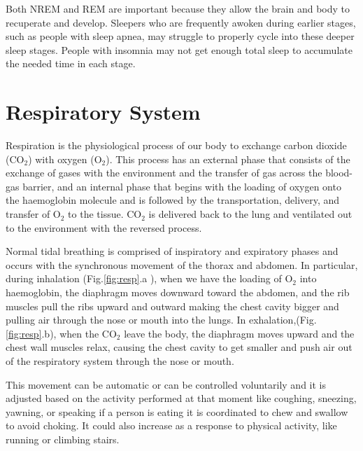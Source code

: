 Both NREM and REM are important because they allow the brain and body to recuperate and develop. Sleepers who are frequently awoken during earlier stages, such as people with sleep apnea, may struggle to properly cycle into these deeper sleep stages. People with insomnia may not get enough total sleep to accumulate the needed time in each stage.


\section{Respiratory System} \label{cap:respiratorySystem}

Respiration is the physiological process\cite{FISHER1983223} of our body to exchange carbon dioxide (CO$_2$) with oxygen (O$_2$). This process has an external phase that consists of the exchange of gases with the environment and the transfer of gas across the blood-gas barrier, and an internal phase that begins with the loading of oxygen onto the haemoglobin molecule and is followed by the transportation, delivery, and transfer of O$_2$ to the tissue. CO$_2$ is delivered back to the lung and ventilated out to the environment with the reversed process.

Normal tidal breathing is comprised of inspiratory and expiratory phases and occurs with the synchronous movement of the thorax and abdomen.
In particular, during inhalation (Fig.\ref{fig:resp}.a ), when we have the loading of O$_2$ into haemoglobin, the diaphragm moves downward toward the abdomen, and the rib muscles pull the ribs upward and outward making the chest cavity bigger and pulling air through the nose or mouth into the lungs. In exhalation,(Fig.\ref{fig:resp}.b), when the CO$_2$ leave the body, the diaphragm moves upward and the chest wall muscles relax, causing the chest cavity to get smaller and push air out of the respiratory system through the nose or mouth.

This movement can be automatic or can be controlled voluntarily and it is adjusted based on the activity performed at that moment like coughing, sneezing, yawning, or speaking if a person is eating it is coordinated to chew and swallow to avoid choking. It could also increase as a response to physical activity, like running or climbing stairs\cite{DelNegro2018BreathingMatters}.\\

